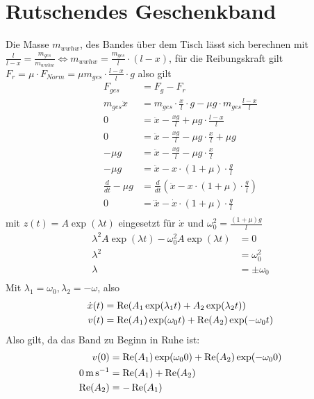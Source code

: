 \documentclass[sectionformat = exercise]{gadsescript}
\begin{document}
\section{Rutschendes Geschenkband}
Die Masse $ m_{wwhw} $, des Bandes über dem Tisch lässt sich berechnen mit $ \frac{ l }{ l - x } = \frac{m_{ges}}{ m_{wwhw} } \iff m_{wwhw} = \frac{m_{ges}}{ l } \cdot (l - x) $,
für die Reibungskraft gilt $ F_{r} = \mu \cdot F_{Norm} = \mu m_{ges} \cdot \frac{ l - x }{ l } \cdot g $
also gilt
\begin{align*}
	F_{ges} &= F_g - F_r \\
	m_{ges} \ddot x &= m_{ges} \cdot \frac{ x }{ l } \cdot g - \mu g \cdot m_{ges} \frac{l - x}{ l }  \\
	0 &= \ddot x - \frac{ xg }{ l } + \mu g \cdot \frac{l - x}{ l } \\
	0 &= \ddot x - \frac{ xg }{ l } - \mu g \cdot \frac{x}{ l } + \mu g \\
	- \mu g &= \ddot x - \frac{ xg }{ l } - \mu g \cdot \frac{x}{ l } \\
	- \mu g &= \ddot x - x \cdot ( 1 + \mu) \cdot \frac{g}{ l } \\
	\frac{ d }{ dt } - \mu g &= \frac{ d }{ dt } \left( \ddot x - x \cdot ( 1 + \mu) \cdot \frac{g}{ l } \right) \\
	0 &= \dddot x - \dot x \cdot ( 1 + \mu) \cdot \frac{g}{ l } \\
\end{align*}
mit $ z(t) = A \exp(\lambda t) $ eingesetzt für $ \dot x $ und $ \omega_0^2 = \frac{(1 + \mu)g}{ l }  $
\begin{align*}
	\lambda^2 A\exp(\lambda t) - \omega_0^2A\exp(\lambda t) &= 0 \\
	\lambda^2 &= \omega_0^2 \\
	\lambda &= \pm\omega_0 \\
\end{align*}
Mit $ \lambda_1 = \omega_0, \lambda_2 = -\omega $, also
\begin{align*}
	\dot x(t) &= \operatorname{Re}(A_1 \exp(\lambda_1 t) + A_2 \exp(\lambda_2 t))\\
	v(t) &= \operatorname{Re}(A_1) \exp(\omega_0 t) + \operatorname{Re}(A_2) \exp(-\omega_0 t)\\
\end{align*}
Also gilt, da das Band zu Beginn in Ruhe ist:
\begin{align*}
	v(0) &= \operatorname{Re}(A_1) \exp(\omega_0 0) + \operatorname{Re}(A_2) \exp(-\omega_0 0)\\
	\qty{ 0 }{ \metre\per\second }  &= \operatorname{Re}(A_1) + \operatorname{Re}(A_2) \\
	\operatorname{Re}(A_2) &= - \operatorname{Re}(A_1) \\
\end{align*}
\end{document}
